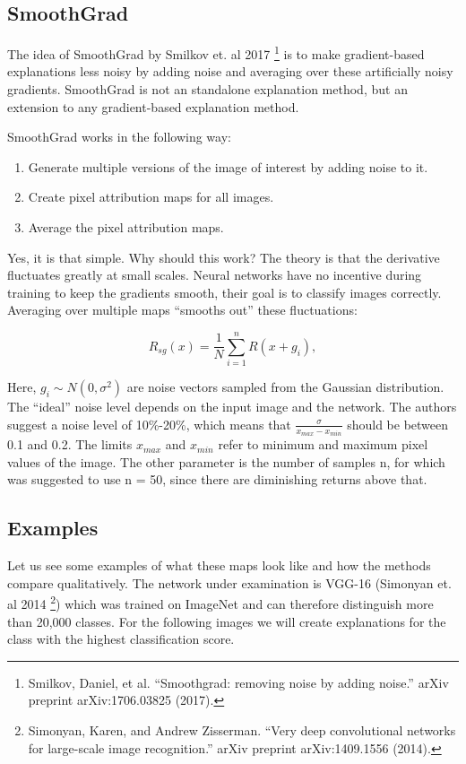 \documentclass[12pt,]{krantz}
\providecommand{\tightlist}{%
  \setlength{\itemsep}{0pt}\setlength{\parskip}{0pt}}
\begin{document}
\subsection{SmoothGrad}\label{smoothgrad}

The idea of SmoothGrad by Smilkov et. al 2017 \footnote{Smilkov, Daniel,
  et al. ``Smoothgrad: removing noise by adding noise.'' arXiv preprint
  arXiv:1706.03825 (2017).} is to make gradient-based explanations less
noisy by adding noise and averaging over these artificially noisy
gradients. SmoothGrad is not an standalone explanation method, but an
extension to any gradient-based explanation method.

SmoothGrad works in the following way:

\begin{enumerate}
\def\labelenumi{\arabic{enumi}.}
\tightlist
\item
  Generate multiple versions of the image of interest by adding noise to
  it.
\item
  Create pixel attribution maps for all images.
\item
  Average the pixel attribution maps.
\end{enumerate}

Yes, it is that simple. Why should this work? The theory is that the
derivative fluctuates greatly at small scales. Neural networks have no
incentive during training to keep the gradients smooth, their goal is to
classify images correctly. Averaging over multiple maps ``smooths out''
these fluctuations:

\[R_{sg}(x)=\frac{1}{N}\sum_{i=1}^n{}R(x+g_i),\]

Here, \(g_i\sim{}N(0,\sigma^2)\) are noise vectors sampled from the
Gaussian distribution. The ``ideal'' noise level depends on the input
image and the network. The authors suggest a noise level of 10\%-20\%,
which means that \(\frac{\sigma}{x_{max} - x_{min}}\) should be between
0.1 and 0.2. The limits \(x_{max}\) and \(x_{min}\) refer to minimum and
maximum pixel values of the image. The other parameter is the number of
samples n, for which was suggested to use n = 50, since there are
diminishing returns above that.

\subsection{Examples}\label{examples-6}

Let us see some examples of what these maps look like and how the
methods compare qualitatively. The network under examination is VGG-16
(Simonyan et. al 2014 \footnote{Simonyan, Karen, and Andrew Zisserman.
  ``Very deep convolutional networks for large-scale image
  recognition.'' arXiv preprint arXiv:1409.1556 (2014).}) which was
trained on ImageNet and can therefore distinguish more than 20,000
classes. For the following images we will create explanations for the
class with the highest classification score.
\end{document}
